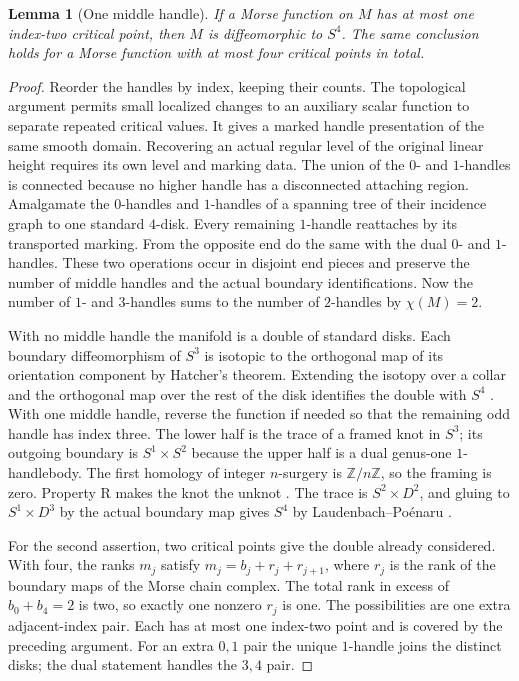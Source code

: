 \documentclass[11pt,letterpaper]{article}
\numberwithin{equation}{section}
\newtheorem{lemma}[theorem]{Lemma}
\begin{document}
\begin{lemma}[One middle handle]\label{lem:one}
If a Morse function on \(M\) has at most one index-two
critical point, then \(M\) is diffeomorphic to \(S^4\).
The same conclusion holds for a Morse function with at most
four critical points in total.
\end{lemma}
\begin{proof}
Reorder the handles by index, keeping their counts. The
topological argument permits small localized changes to an
auxiliary scalar function to separate repeated critical values.
It gives a marked handle presentation of the same smooth
domain. Recovering an actual regular level of the original
linear height requires its own level and marking data. The
union of the \(0\)- and \(1\)-handles is connected because
no higher handle has a disconnected attaching region.
Amalgamate the \(0\)-handles and \(1\)-handles of a spanning
tree of their incidence graph to one standard \(4\)-disk.
Every remaining \(1\)-handle reattaches by its transported
marking. From the opposite end do the same with the dual
\(0\)- and \(1\)-handles. These two operations occur in
disjoint end pieces and preserve the number of middle
handles and the actual boundary identifications. Now the
number of \(1\)- and \(3\)-handles sums to the number of
\(2\)-handles by \(\chi(M)=2\).

With no middle handle the manifold is a double of standard
disks. Each boundary diffeomorphism of \(S^3\) is isotopic
to the orthogonal map of its orientation component by
Hatcher's theorem. Extending the isotopy over a collar
and the orthogonal map over the rest of the disk identifies
the double with \(S^4\) \cite{Hatcher1983Smale}.
With one middle handle, reverse the function if needed so
that the remaining odd handle has index three. The lower
half is the trace of a framed knot in \(S^3\); its outgoing
boundary is \(S^1\times S^2\) because the upper half is a
dual genus-one \(1\)-handlebody. The first homology of
integer \(n\)-surgery is \(\mathbb Z/n\mathbb Z\), so the
framing is zero. Property R makes the knot the unknot
\cite[Corollary 8.3 and Remark 8.5]{Gabai1987FoliationsIII}.
The trace is \(S^2\times D^2\), and gluing to \(S^1\times D^3\)
by the actual boundary map gives \(S^4\) by
Laudenbach--Po\'enaru \cite[Theorem A]{LaudenbachPoenaru1972Handlebodies}.

For the second assertion, two critical points give the
double already considered. With four, the ranks \(m_j\)
satisfy \(m_j=b_j+r_j+r_{j+1}\), where \(r_j\) is the rank
of the boundary maps of the Morse chain complex. The total
rank in excess of \(b_0+b_4=2\) is two, so exactly one
nonzero \(r_j\) is one. The possibilities are one extra
adjacent-index pair. Each has at most one index-two
point and is covered by the preceding argument. For an
extra \(0,1\) pair the unique \(1\)-handle joins the distinct
disks; the dual statement handles the \(3,4\) pair.
\end{proof}
\end{document}
